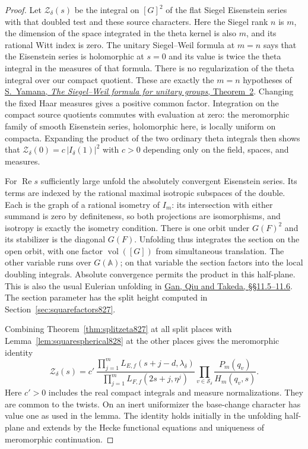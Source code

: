 \documentclass[a4paper,11pt]{article}
\theoremstyle{definition}
\theoremstyle{remark}
\numberwithin{equation}{section}
\begin{document}
\begin{proof}
Let \(\mathcal Z_\delta(s)\) be the integral on \([G]^2\)
of the flat Siegel Eisenstein series with that doubled test
and these source characters. Here the Siegel rank \(n\) is
\(m\), the dimension of the space integrated in the theta
kernel is also \(m\), and its rational Witt index is zero.
The unitary Siegel--Weil formula at \(m=n\) says that the
Eisenstein series is holomorphic at \(s=0\) and its value
is twice the theta integral in the measures of that formula.
There is no regularization of the theta integral over our
compact quotient. These are exactly the \(m=n\) hypotheses of
\href{https://msp.org/pjm/2013/264-1/pjm-v264-n1-p11-s.pdf}
{S.~Yamana, \emph{The Siegel--Weil formula for unitary
groups}, Theorem~2}. Changing the fixed Haar measures gives
a positive common factor. Integration on the compact source
quotients commutes with evaluation at zero: the meromorphic
family of smooth Eisenstein series, holomorphic here, is
locally uniform on compacta. Expanding the product of the
two ordinary theta integrals then shows that
\(\mathcal Z_\delta(0)=c\,|I_\delta(1)|^2\) with \(c>0\)
depending only on the field, spaces, and measures.

For \(\operatorname{Re}s\) sufficiently large unfold the
absolutely convergent Eisenstein series. Its terms are indexed
by the rational maximal isotropic subspaces of the double.
Each is the graph of a rational isometry of \(I_m\): its
intersection with either summand is zero by definiteness,
so both projections are isomorphisms, and isotropy is exactly
the isometry condition. There is one orbit under \(G(F)^2\)
and its stabilizer is the diagonal \(G(F)\). Unfolding thus
integrates the section on the open orbit, with one factor
\(\operatorname{vol}([G])\) from simultaneous translation.
The other variable runs over \(G(\mathbb A)\); on that
variable the section factors into the local doubling
integrals. Absolute convergence permits the product in
this half-plane. This is also the usual Eulerian unfolding
in \href{https://arxiv.org/pdf/1207.4709}{Gan, Qiu and
Takeda, \S\S11.5--11.6}. The section parameter has the
split height computed in Section~\ref{sec:squarefactors827}.

Combining Theorem~\ref{thm:splitzeta827} at all split places
with Lemma~\ref{lem:squarespherical828} at the other places
gives the meromorphic identity
\[
 \mathcal Z_\delta(s)=c'\,
 \frac{\displaystyle\prod_{j=1}^m L_{E,f}(s+j-d,\lambda_\delta)}
      {\displaystyle\prod_{j=1}^m L_{F,f}(2s+j,\eta^j)}
       \prod_{v\in\mathcal S_\delta}\frac{P_m(q_v)}{H_m(q_v,s)} .
\]
Here \(c'>0\) includes the real compact integrals and measure
normalizations. They are common to the twists. On an inert
uniformizer the base-change character has value one as used
in the lemma. The identity holds initially in the unfolding
half-plane and extends by the Hecke functional equations
and uniqueness of meromorphic continuation.


\end{proof}
\end{document}
